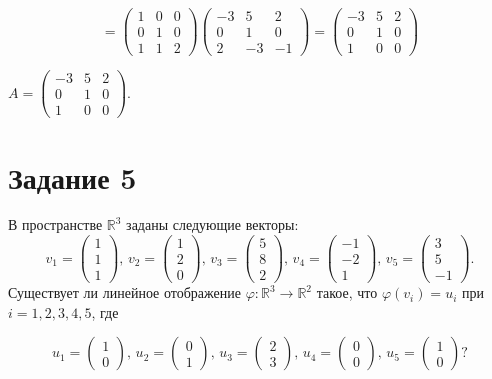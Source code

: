 \documentclass[a4paper,12pt]{article}
\newcommand{\aanswer}{\par\vspace{5pt}\noindent{\bf Ответ. }}
\begin{document}
$$=
\begin{pmatrix}
1&0&0\\
0&1&0\\
1&1&2
\end{pmatrix}
\begin{pmatrix}
-3&5&2\\
0&1&0\\
2&-3&-1
\end{pmatrix}
=
\begin{pmatrix}
-3&5&2\\
0&1&0\\
1&0&0
\end{pmatrix}
$$ 
\aanswer
$A=\left(
\begin{smallmatrix}
-3&5&2\\
0&1&0\\
1&0&0
\end{smallmatrix} \right).$
\newpage
\section*{Задание 5}
В пространстве $\mathbb R^3$ заданы следующие векторы:
\[
v_1 = 
\begin{pmatrix}
{1}\\{1}\\{1}
\end{pmatrix},\,
v_2 = 
\begin{pmatrix}
{1}\\{2}\\{0}
\end{pmatrix},\,
v_3 = 
\begin{pmatrix}
{5}\\{8}\\{2}
\end{pmatrix},\,
v_4 = 
\begin{pmatrix}
{-1}\\{-2}\\{1}
\end{pmatrix},\,
v_5 = 
\begin{pmatrix}
{3}\\{5}\\{-1}
\end{pmatrix}.
\]
Существует ли линейное отображение $\varphi\colon \mathbb R^3\to \mathbb R^2$ такое, что $\varphi(v_i) = u_i$ при $i = 1, 2, 3, 4, 5$, где

\[
u_1 = 
\begin{pmatrix}
{1}\\{0}
\end{pmatrix},\,
u_2 = 
\begin{pmatrix}
{0}\\{1}
\end{pmatrix},\,
u_3 = 
\begin{pmatrix}
{2}\\{3}
\end{pmatrix},\,
u_4 = 
\begin{pmatrix}
{0}\\{0}
\end{pmatrix},\,
u_5 = 
\begin{pmatrix}
{1}\\{0}
\end{pmatrix}?
\]
\end{document}
